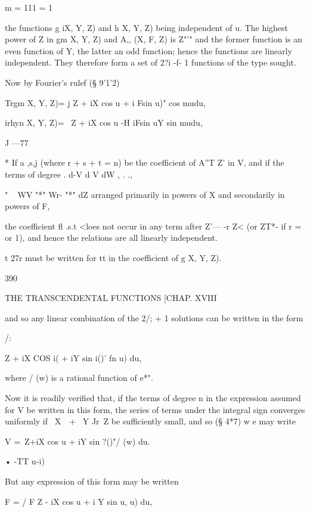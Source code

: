 m = 111 = 1 

the functions g iX, Y, Z) and h   X, Y, Z) being independent of u. The 
highest power of Z in gm  X, Y, Z) and A,,  (X, F, Z) is Z"'"  and the former 
function is an even function of Y, the latter an odd function; hence 
the functions are linearly independent. They therefore form a set of 
2?i -f- 1 functions of the type sought. 

Now by Fourier's rulef (§ 9'1'2) 

Trgm  X, Y, Z)= j  Z + iX cos u + i Fsin u)" cos mudu, 

irhyn  X, Y, Z)= \  Z + iX cos u -H iFsin uY sin mudu, 

J —77 

* If a ,s,j (where r + s + t = n) be the coefficient of A''T Z' in V, and if the terms of degree 
  . d-V d V dW   , . ., 

" ~ WV "*" Wr- "*" dZ  arranged primarily in powers of X and secondarily in powers of F, 

the coefficient fl .s.t <loes not occur in any term after Z'— -r Z< (or ZT*-   if r = or 1), and 
hence the relations are all linearly independent. 

t 27r must be written for tt in the coefficient of g   X, Y, Z). 



390 



THE TRANSCENDENTAL FUNCTIONS [CHAP. XVIII 



and so any linear combination of the 2/; + 1 solutions can be written in the 
form 



/: 



 Z + iX COS i( + iY sin i()' fn  u) du, 

where / (w) is a rational function of e*". 

Now it is readily verified that, if the terms of degree n in the expression 
assumed for V be written in this form, the series of terms under the integral 
sign converges uniformly if \ X\ \   + \ Y Jr\ Z  be sufficiently small, and so 
(§ 4*7) w e may write 

V =\    Z+iX cos u + iY sin ?()"/  (w) du. 

• -TT n-i) 

But any expression of this form may be written 

F = / F Z - iX cos u + i Y sin u, u) du, 

